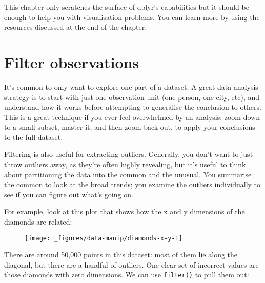 This chapter only scratches the surface of dplyr's capabilities but it
should be enough to help you with visualisation problems. You can learn
more by using the resources discussed at the end of the chapter.

\section{Filter observations}

It's common to only want to explore one part of a dataset. A great data
analysis strategy is to start with just one observation unit (one
person, one city, etc), and understand how it works before attempting to
generalise the conclusion to others. This is a great technique if you
ever feel overwhelmed by an analysis: zoom down to a small subset,
master it, and then zoom back out, to apply your conclusions to the full
dataset. 

Filtering is also useful for extracting outliers. Generally, you don't
want to just throw outliers away, as they're often highly revealing, but
it's useful to think about partitioning the data into the common and the
unusual. You summarise the common to look at the broad trends; you
examine the outliers individually to see if you can figure out what's
going on.

For example, look at this plot that shows how the x and y dimensions of
the diamonds are related:

\begin{Shaded}
\begin{Highlighting}[]
\StringTok{ }
\StringTok{  }\NormalTok{()}
\end{Highlighting}
\end{Shaded}

\begin{figure}[H]
  \centering
  \texttt{[image: \_figures/data-manip/diamonds-x-y-1]}
\end{figure}

There are around 50,000 points in this dataset: most of them lie along
the diagonal, but there are a handful of outliers. One clear set of
incorrect values are those diamonds with zero dimensions. We can use
\texttt{filter()} to pull them out:

